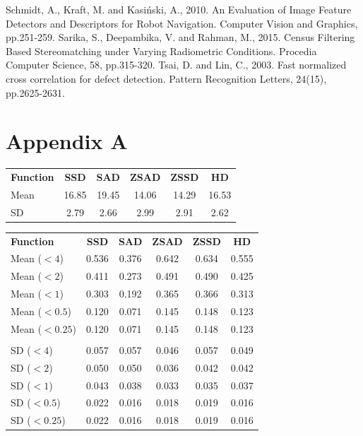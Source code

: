 \documentclass[conference]{IEEEtran}
\begin{document}
\newpage
\begin{thebibliography}{00}
 Schmidt, A., Kraft, M. and Kasiński, A., 2010. An Evaluation of Image Feature Detectors and Descriptors for Robot Navigation. Computer Vision and Graphics, pp.251-259.
 Sarika, S., Deepambika, V. and Rahman, M., 2015. Census Filtering Based Stereomatching under Varying Radiometric Conditions. Procedia Computer Science, 58, pp.315-320.
 Tsai, D. and Lin, C., 2003. Fast normalized cross correlation for defect detection. Pattern Recognition Letters, 24(15), pp.2625-2631.
\end{thebibliography}
\vspace{12pt}

\section*{Appendix A}
\begin{center}
    \begin{tabular}{l c c c c c}
        \textbf{Function} & \textbf{SSD} & \textbf{SAD} & \textbf{ZSAD} & \textbf{ZSSD} & \textbf{HD} \\ [0.5ex] 
        Mean & 16.85 & 19.45 & 14.06 & 14.29 & 16.53 \\
        SD & 2.79 & 2.66 & 2.99 & 2.91 & 2.62
    \end{tabular}
\end{center}
\begin{center}
    \begin{tabular}{l c c c c c}
        \textbf{Function} & \textbf{SSD} & \textbf{SAD} & \textbf{ZSAD} & \textbf{ZSSD} & \textbf{HD} \\ [0.5ex] 
        Mean ($<4$) & 0.536 & 0.376 & 0.642 & 0.634 & 0.555 \\
        Mean ($<2$) & 0.411 & 0.273 & 0.491 & 0.490 & 0.425 \\
        Mean ($<1$) & 0.303 & 0.192 & 0.365 & 0.366 & 0.313 \\
        Mean ($<0.5$) & 0.120 & 0.071 & 0.145 & 0.148 & 0.123 \\
        Mean ($<0.25$) & 0.120 & 0.071 & 0.145 & 0.148 & 0.123 \\
        & & & & & \\
        SD ($<4$) & 0.057 & 0.057 & 0.046 & 0.057 & 0.049 \\
        SD ($<2$) & 0.050 & 0.050 & 0.036 & 0.042 & 0.042 \\
        SD ($<1$) & 0.043 & 0.038 & 0.033 &  0.035 & 0.037 \\
        SD ($<0.5$) & 0.022 & 0.016 & 0.018 & 0.019 & 0.016 \\
        SD ($<0.25$) & 0.022 & 0.016 & 0.018 & 0.019 & 0.016 \\
    \end{tabular}
\end{center}
\end{document}
